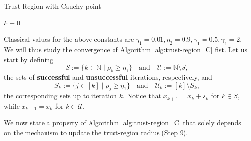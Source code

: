 \documentclass[10pt,a4paper]{article}
\begin{document}
\begin{algorithm}[H]\label{alg:trust-region_C}
	\caption{Trust-Region with Cauchy point}
	
	
	$k = 0$
	
	\While{$||\grad(x_k)||>\epsilon$}{
		
		Compute a step $s_k$ that satisfies \eqref{eq:cauchy_point}. 
		
		Compute $\rho_k:= \frac{f(x_k)-f(x_k+s_k)}{q_k(0)-q_k(s_k)}$
		
		\If{$\rho_k\geq \eta_1$}{$x_{k+1} = x_k +s_k$}
		
		\Else{$x_{k+1} = x_k$}
		
		$\Delta_{k+1} = \begin{cases}
			\gamma_2 \Delta_k \quad &\text{if } \rho_k\geq \eta_2\\
			\Delta_k \quad &\text{if } \rho_k\in [\eta_1, \eta_2)\\
			\gamma_1 \Delta_k \quad &\text{if } \rho_k<\eta_1\\
		\end{cases}$
		
		$k = k+1$
	}
\end{algorithm}
\noindent Classical values for the above constants are $\eta_1=0.01, \eta_2=0.9, \gamma_1=0.5, \gamma_1=2$. We will thus study the convergence of Algorithm \ref{alg:trust-region_C} fist. Let us start by defining 
\begin{equation*}
	S := \{k \in \mathbb{N} \mid \rho_k \geq \eta_1\} \quad \text{and} \quad \mathcal{U}:= \mathbb{N} \setminus S,
\end{equation*}
the sets of \textbf{successful} and \textbf{unsuccessful} iterations, respectively, and
\begin{equation*}
	S_k := \{j \in [k] \mid \rho_j \geq \eta_1\} \quad \text{and} \quad \mathcal{U}_k := [k] \setminus S_k,
\end{equation*}
the corresponding sets up to iteration $k$. Notice that $x_{k+1} = x_k + s_k$ for $k \in S$, while $x_{k+1} = x_k$ for $k \in \mathcal{U}$.

We now state a property of Algorithm \ref{alg:trust-region_C} that solely depends on the mechanism to update the trust-region radius (Step 9).
\end{document}
